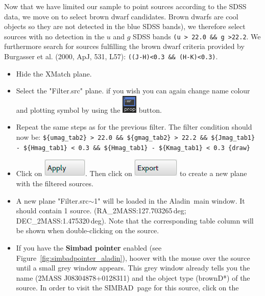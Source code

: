 \documentclass [a4paper, 12pt]{article}
\newcommand{\aladin}{{\textsc{A}{ladin}}}
\newcommand{\simbad}{{\textsc{SIMBAD}}}
\begin{document}
Now that we have limited our sample to point sources according to the 
SDSS data, we move on to select brown dwarf candidates. Brown dwarfs are 
cool objects so they are not detected in the blue SDSS bands), we therefore 
select sources with no detection in the $u$ and $g$ SDSS bands \texttt{(u > 
22.0 \&\& g >22.2}. We furthermore search for sources fulfilling the brown 
dwarf criteria provided by Burgasser et al. (2000, ApJ, 531, L57): 
\texttt{((J-H)<0.3 \&\& (H-K)<0.3)}.

\begin{itemize}
    \item Hide the XMatch plane.
    \item Select the "Filter.src" plane. if you wish you can again change name 
    colour and plotting symbol by using the \includegraphics[width=0.03 
    \textwidth]{../images/aladin_button_properties.png} button.
    \item Repeat the same steps as for the previous filter. The filter 
    condition should now be: \texttt{\$\{umag\_tab2\} > 22.0 \&\& 
    \$\{gmag\_tab2\} > 22.2 \&\& \$\{Jmag\_tab1\} - \$\{Hmag\_tab1\} < 0.3 \&\&
    \$\{Hmag\_tab1\} - \$\{Kmag\_tab1\} < 0.3 \{draw\}}
    \item Click on \includegraphics[width=0.1 
    \textwidth]{../images/aladin_filter_apply.png}. Then click on 
    \includegraphics[width=0.1 
    \textwidth]{../images/aladin_filter_export.png} to create a new plane with
    the filtered sources.
    \item A new plane "Filter.src$\sim$1" will be loaded in the \aladin\ main 
    window. It should contain 1 source. (RA\_2MASS:127.703265\,deg;
    DEC\_2MASS:1.475320\,deg). Note that the corresponding table column will be 
    shown when double-clicking on the source.
    \item If you have the \textbf{Simbad pointer} enabled (see 
    Figure~\ref{fig:simbadpointer_aladin}), hoover with the mouse over the 
    source until a small grey window appears. This grey window already tells 
    you the name (2MASS J08304878+0128311) and the object type (brownD*) of the 
    source. In order to visit the \simbad\ page for this source, click on the 

\end{itemize}
\end{document}
